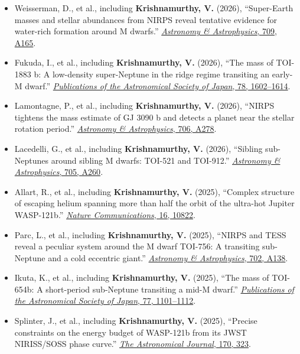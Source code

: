 \documentclass[10pt,a4paper]{article}
\begin{document}
\begin{itemize}
\item
Weisserman, D., et al., including \textbf{Krishnamurthy, V.} (2026),
``Super-Earth masses and stellar abundances from NIRPS reveal tentative
evidence for water-rich formation around M dwarfs.''
\href{https://doi.org/10.1051/0004-6361/202558011}
{\emph{Astronomy \& Astrophysics}, 709, A165}.

\item
Fukuda, I., et al., including \textbf{Krishnamurthy, V.} (2026),
``The mass of TOI-1883 b: A low-density super-Neptune in the ridge regime
transiting an early-M dwarf.''
\href{https://doi.org/10.1093/pasj/psag084}
{\emph{Publications of the Astronomical Society of Japan}, 78, 1602--1614}.

\item
Lamontagne, P., et al., including \textbf{Krishnamurthy, V.} (2026),
``NIRPS tightens the mass estimate of GJ 3090 b and detects a planet near
the stellar rotation period.''
\href{https://doi.org/10.1051/0004-6361/202556887}
{\emph{Astronomy \& Astrophysics}, 706, A278}.

\item
Lacedelli, G., et al., including \textbf{Krishnamurthy, V.} (2026),
``Sibling sub-Neptunes around sibling M dwarfs: TOI-521 and TOI-912.''
\href{https://doi.org/10.1051/0004-6361/202557304}
{\emph{Astronomy \& Astrophysics}, 705, A260}.

\item
Allart, R., et al., including \textbf{Krishnamurthy, V.} (2025),
``Complex structure of escaping helium spanning more than half the orbit
of the ultra-hot Jupiter WASP-121b.''
\href{https://doi.org/10.1038/s41467-025-66628-5}
{\emph{Nature Communications}, 16, 10822}.

\item
Parc, L., et al., including \textbf{Krishnamurthy, V.} (2025),
``NIRPS and TESS reveal a peculiar system around the M dwarf TOI-756:
A transiting sub-Neptune and a cold eccentric giant.''
\href{https://doi.org/10.1051/0004-6361/202555684}
{\emph{Astronomy \& Astrophysics}, 702, A138}.

\item
Ikuta, K., et al., including \textbf{Krishnamurthy, V.} (2025),
``The mass of TOI-654b: A short-period sub-Neptune transiting a
mid-M dwarf.''
\href{https://doi.org/10.1093/pasj/psaf090}
{\emph{Publications of the Astronomical Society of Japan}, 77, 1101--1112}.

\item
Splinter, J., et al., including \textbf{Krishnamurthy, V.} (2025),
``Precise constraints on the energy budget of WASP-121b from its
JWST NIRISS/SOSS phase curve.''
\href{https://doi.org/10.3847/1538-3881/ae0e52}
{\emph{The Astronomical Journal}, 170, 323}.


\end{itemize}
\end{document}
